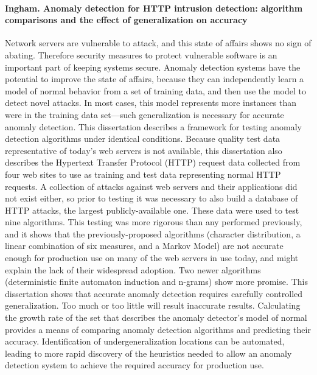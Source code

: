 \paragraph*{Ingham. Anomaly detection for HTTP intrusion detection: algorithm comparisons and the effect of generalization on accuracy}
\cite{ingham2007anomaly}
Network servers are vulnerable to attack, and this state of affairs shows no sign of abating. Therefore security measures to protect vulnerable software is an important part of keeping systems secure. Anomaly detection systems have the potential to improve the state of affairs, because they can independently learn a model of normal behavior from a set of training data, and then use the model to detect novel attacks. In most cases, this model represents more instances than were in the training data set—such generalization is necessary for accurate anomaly detection.
 This dissertation describes a framework for testing anomaly detection algorithms under identical conditions. Because quality test data representative of today’s web servers is not available, this dissertation also describes the Hypertext Transfer Protocol (HTTP) request data collected from four web sites to use as training and test data representing normal HTTP requests. A collection of attacks against web servers and their applications did not exist either, so prior to testing it was necessary to also build a database of HTTP attacks, the largest publicly-available one.
  These data were used to test nine algorithms. This testing was more rigorous than any performed previously, and it shows that the previously-proposed algorithms (character distribution, a linear combination of six measures, and a Markov Model) are not accurate enough for production use on many of the web servers in use today, and might explain the lack of their widespread adoption. Two newer algorithms (deterministic finite automaton induction and n-grams) show more promise.
  This dissertation shows that accurate anomaly detection requires carefully controlled generalization. Too much or too little will result inaccurate results. Calculating the growth rate of the set that describes the anomaly detector’s model of normal provides a means of comparing anomaly detection algorithms and predicting their accuracy. Identification of undergeneralization locations can be automated, leading to more rapid discovery of the heuristics needed to allow an anomaly detection system to achieve the required accuracy for production use.
  
